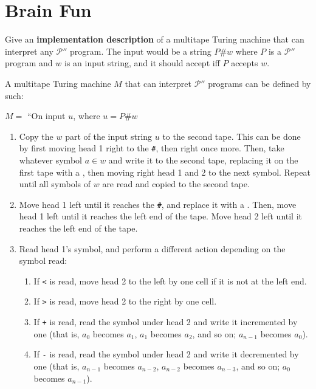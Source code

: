 \documentclass{article}
\newcommand\blanksymbol\textvisiblespace
\begin{document}
    \section{Brain Fun}

    Give an \textbf{implementation description} of a multitape Turing machine that can interpret any $\mathcal{P}''$ program. The input would be a string $P\texttt{\#}w$ where $P$ is a $\mathcal{P}''$ program and $w$ is an input string, and it should accept iff $P$ accepts $w$.

    A multitape Turing machine $M$ that can interpret $\mathcal{P}''$ programs can be defined by such:

    $M = $ ``On input $u$, where $u = P\texttt{\#}w$

    \begin{enumerate}[1.]
        \item Copy the $w$ part of the input string $u$ to the second tape. This can be done by first moving head 1 right to the \texttt{\#}, then right once more. Then, take whatever symbol $a \in w$ and write it to the second tape, replacing it on the first tape with a \blanksymbol, then moving right head 1 and 2 to the next symbol. Repeat until all symbols of $w$ are read and copied to the second tape.

        \item Move head 1 left until it reaches the \texttt{\#}, and replace it with a \blanksymbol. Then, move head 1 left until it reaches the left end of the tape. Move head 2 left until it reaches the left end of the tape.

        \item Read head 1's symbol, and perform a different action depending on the symbol read:
            \begin{enumerate}[-]
                \item If \texttt{<} is read, move head 2 to the left by one cell if it is not at the left end.

                \item If \texttt{>} is read, move head 2 to the right by one cell.

                \item If \texttt{+} is read, read the symbol under head 2 and write it incremented by one (that is, $a_0$ becomes $a_1$, $a_1$ becomes $a_2$, and so on; $a_{n-1}$ becomes $a_0$).

                \item If \texttt{-} is read, read the symbol under head 2 and write it decremented by one (that is, $a_{n-1}$ becomes $a_{n-2}$, $a_{n-2}$ becomes $a_{n-3}$, and so on; $a_0$ becomes $a_{n-1}$).


\end{enumerate}
\end{enumerate}
\end{document}
